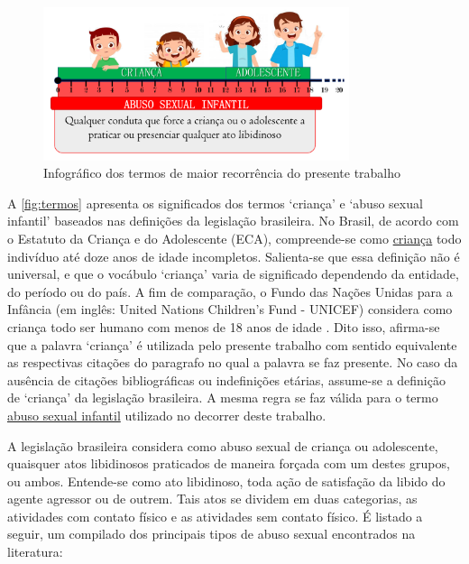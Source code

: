 \begin{figure}[htb]
	\caption{\label{fig:termos}Infográfico dos termos de maior recorrência do presente trabalho}
	\begin{center}
	    \includegraphics[width=0.8\textwidth]{./Figuras/Termos.pdf}
	\end{center}
\end{figure}


A \autoref{fig:termos} apresenta os significados dos termos `criança' e `abuso sexual infantil' baseados nas definições da legislação brasileira. No Brasil, de acordo com o Estatuto da Criança e do Adolescente (ECA), compreende-se como \underline{crian}ç\underline{a} todo indivíduo até doze anos de idade incompletos. Salienta-se que essa definição não é universal, e que o vocábulo `criança' varia de significado dependendo da entidade, do período ou do país. A fim de comparação, o Fundo das Nações Unidas para a Infância (em inglês: United Nations Children’s Fund - UNICEF) considera como criança todo ser humano com menos de 18 anos de idade \cite{brasil1988convenccao}. Dito isso, afirma-se que a palavra `criança' é utilizada pelo presente trabalho com sentido equivalente as respectivas citações do paragrafo no qual a palavra se faz presente. No caso da ausência de citações bibliográficas ou indefinições etárias, assume-se a definição de `criança' da legislação brasileira. A mesma regra se faz válida para o termo \underline{abuso sexual infantil} utilizado no decorrer deste trabalho.

A legislação brasileira considera como abuso sexual de criança ou adolescente, quaisquer atos libidinosos praticados de maneira forçada com um destes grupos, ou ambos. Entende-se como ato libidinoso, toda ação de satisfação da libido do agente agressor ou de outrem. Tais atos se dividem em duas categorias, as atividades com contato físico e as atividades sem contato físico. É listado a seguir, um compilado dos principais tipos de abuso sexual encontrados na literatura: 


